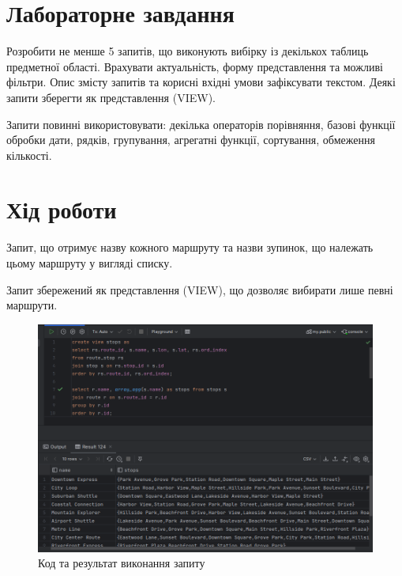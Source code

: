 \documentclass[14pt]{extreport}
\begin{document}
\begin{normalsize}
	\section*{Лабораторне завдання}
	Розробити не менше 5 запитів, що виконують вибірку із декількох таблиць предметної області. Врахувати актуальність, форму представлення та можливі фільтри. Опис змісту запитів та корисні вхідні умови зафіксувати текстом. Деякі запити зберегти як представлення (VIEW).
	
	Запити повинні використовувати: декілька операторів порівняння, базові функції обробки дати, рядків, групування, агрегатні функції, сортування, обмеження кількості.
	
	\section*{Хід роботи}
	Запит, що отримує назву кожного маршруту та назви зупинок, що належать цьому маршруту у вигляді списку.
	
	Запит збережений як представлення (VIEW), що дозволяє  вибирати лише певні маршрути.
	

	
	\begin{figure}[H]
		\centering
		\includegraphics[scale=0.5]{1}
		\caption{Код та результат виконання запиту}
	\end{figure}
	

\end{normalsize}
\end{document}
